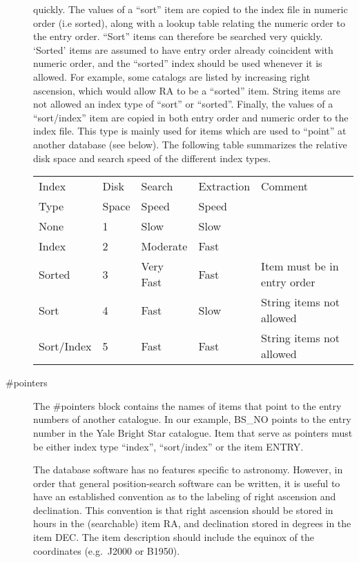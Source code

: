 \begin{description}
quickly.   The values of a ``sort'' item are copied to the index file
in numeric order (i.e sorted), along with a lookup table relating 
the numeric order to the entry order.  ``Sort'' items can therefore be
searched very quickly.  `Sorted' items are assumed to have entry order
already coincident with numeric order, and the ``sorted'' index should be
used whenever it is allowed. For example, some catalogs are
listed by increasing right ascension, which would allow RA to be a
``sorted'' item.  String items are not allowed an index type of ``sort'' or
``sorted''.  Finally, the values of a ``sort/index'' item are copied in both
entry order and numeric order to the index file.  This type is mainly used
for items which are used to ``point'' at another database (see below).
The following table summarizes the relative disk space and search
speed of the different index types. 
\vspace{0.1in}
\begin{tabular}{|l|l|l|l|l|} \hline
Index  & Disk  & Search & Extraction & Comment \\ 
Type & Space  & Speed & Speed & \\ \hline\hline
None & 1 &  Slow & Slow & \\ \hline
Index & 2 & Moderate & Fast & \\ \hline
Sorted & 3 & Very Fast & Fast & Item must be in entry order \\ \hline 
Sort & 4 & Fast & Slow & String items not allowed \\   \hline
Sort/Index & 5 & Fast & Fast & String items not allowed \\ \hline
\end{tabular}
\vspace{0.1in}
\item [\#pointers] The \#pointers block contains the names of items
that point to the entry numbers of another catalogue.  In our example,
BS\_NO points to the entry number in the Yale Bright Star catalogue.
Item that serve as pointers must be either index type ``index'',
``sort/index'' or the item ENTRY.

The database software has no features specific to astronomy.    However,
in order that general position-search software can be written, it is useful
to have an established convention as to the labeling of right ascension and
declination.   This convention is that right ascension should be
stored in hours in the (searchable) item RA, and declination stored in
degrees in the item DEC.     The item description should include the 
equinox of the coordinates (e.g.\ J2000 or B1950).
 
\end{description}
